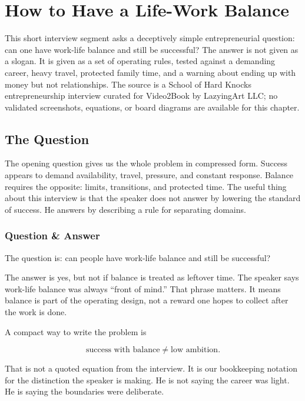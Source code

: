 \chapter{How to Have a Life-Work Balance}

This short interview segment asks a deceptively simple entrepreneurial question: can one have work-life balance and still be successful? The answer is not given as a slogan. It is given as a set of operating rules, tested against a demanding career, heavy travel, protected family time, and a warning about ending up with money but not relationships. The source is a School of Hard Knocks entrepreneurship interview curated for Video2Book by LazyingArt LLC; no validated screenshots, equations, or board diagrams are available for this chapter.

\section{The Question}

The opening question gives us the whole problem in compressed form. Success appears to demand availability, travel, pressure, and constant response. Balance requires the opposite: limits, transitions, and protected time. The useful thing about this interview is that the speaker does not answer by lowering the standard of success. He answers by describing a rule for separating domains.

\subsection{Question \& Answer}

The question is: can people have work-life balance and still be successful?

The answer is yes, but not if balance is treated as leftover time. The speaker says work-life balance was always ``front of mind.'' That phrase matters. It means balance is part of the operating design, not a reward one hopes to collect after the work is done.

A compact way to write the problem is

\begin{equation}
\text{success with balance}
\neq
\text{low ambition}.
\end{equation}

That is not a quoted equation from the interview. It is our bookkeeping notation for the distinction the speaker is making. He is not saying the career was light. He is saying the boundaries were deliberate.

